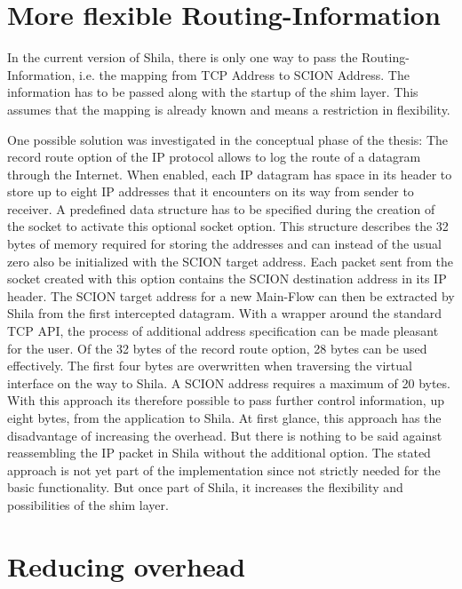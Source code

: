 \section*{More flexible Routing-Information}

In the current version of Shila, there is only one way to pass the Routing-Information, i.e. the mapping from TCP Address to SCION Address. The information has to be passed along with the startup of the shim layer. This assumes that the mapping is already known and means a restriction in flexibility.  

One possible solution was investigated in the conceptual phase of the thesis: The record route option of the IP protocol allows to log the route of a datagram through the Internet. When enabled, each IP datagram has space in its header to store up to eight IP addresses that it encounters on its way from sender to receiver. A predefined data structure has to be specified during the creation of the socket to activate this optional socket option. This structure describes the 32 bytes of memory required for storing the addresses and can instead of the usual zero also be initialized with the SCION target address. Each packet sent from the socket created with this option contains the SCION destination address in its IP header. The SCION target address for a new Main-Flow can then be extracted by Shila from the first intercepted datagram. With a wrapper around the standard TCP API, the process of additional address specification can be made pleasant for the user. Of the 32 bytes of the record route option, 28 bytes can be used effectively. The first four bytes are overwritten when traversing the virtual interface on the way to Shila. A SCION address requires a maximum of 20 bytes. With this approach its therefore possible to pass further control information, up eight bytes, from the application to Shila. At first glance, this approach has the disadvantage of increasing the overhead. But there is nothing to be said against reassembling the IP packet in Shila without the additional option. The stated approach is not yet part of the implementation since not strictly needed for the basic functionality. But once part of Shila, it increases the flexibility and possibilities of the shim layer.

\section*{Reducing overhead}

